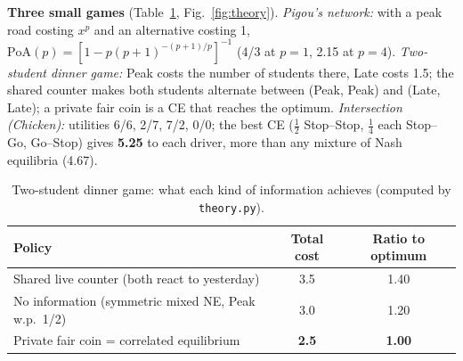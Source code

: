 \documentclass{article}
\begin{document}
\textbf{Three small games} (Table~\ref{tab:toy}, Fig.~\ref{fig:theory}). \emph{Pigou's network:} with a peak road
costing $x^p$ and an alternative costing 1, $\mathrm{PoA}(p)=[1-p(p+1)^{-(p+1)/p}]^{-1}$ (4/3 at $p{=}1$, 2.15
at $p{=}4$). \emph{Two-student dinner game:} Peak costs the number of students there, Late costs 1.5; the shared
counter makes both students alternate between (Peak, Peak) and (Late, Late); a private fair coin is a CE that
reaches the optimum. \emph{Intersection (Chicken):} utilities 6/6, 2/7, 7/2, 0/0; the best CE ($\frac12$ Stop--Stop,
$\frac14$ each Stop--Go, Go--Stop) gives \textbf{5.25} to each driver, more than any mixture of Nash equilibria (4.67).

\begin{table}[H]\centering\small
\caption{Two-student dinner game: what each kind of information achieves (computed by \texttt{theory.py}).}\label{tab:toy}
\begin{tabular}{lcc}\toprule
Policy & Total cost & Ratio to optimum\\\midrule
Shared live counter (both react to yesterday) & 3.5 & 1.40\\
No information (symmetric mixed NE, Peak w.p.\ 1/2) & 3.0 & 1.20\\
Private fair coin = correlated equilibrium & \textbf{2.5} & \textbf{1.00}\\\bottomrule
\end{tabular}\end{table}

\end{document}

